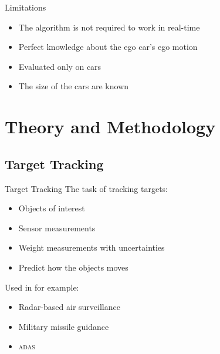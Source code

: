 \documentclass{beamer}
\newcommand{\adas}{\textsc{adas}\xspace}
\begin{document}
\begin{frame}{Limitations}
	\begin{itemize}
		\item The algorithm is not required to work in real-time
		\item Perfect knowledge about the ego car's ego motion
		\item Evaluated only on cars
		\item The size of the cars are known
	\end{itemize}
\end{frame}

\section{Theory and Methodology}

\subsection{Target Tracking}

\begin{frame}{Target Tracking}
	The task of tracking targets:
	\begin{itemize}
		\item Objects of interest
		\item Sensor measurements
		\item Weight measurements with uncertainties
		\item Predict how the objects moves
	\end{itemize}
	Used in for example:
	\begin{itemize}
		\item Radar-based air surveillance
		\item Military missile guidance
		\item \adas
	\end{itemize}
\end{frame}
\end{document}
